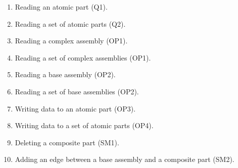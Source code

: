 \begin{enumerate}
	\item Reading an atomic part (Q1).
	\item Reading a set of atomic parts (Q2).
	\item Reading a complex assembly (OP1).
	\item Reading a set of complex assemblies (OP1).
	\item Reading a base assembly (OP2).
	\item Reading a set of base assemblies (OP2).
	\item Writing data to an atomic part (OP3).
	\item Writing data to a set of atomic parts (OP4).
	\item Deleting a composite part (SM1).
	\item Adding an edge between a base assembly and a composite part (SM2).
\end{enumerate}



